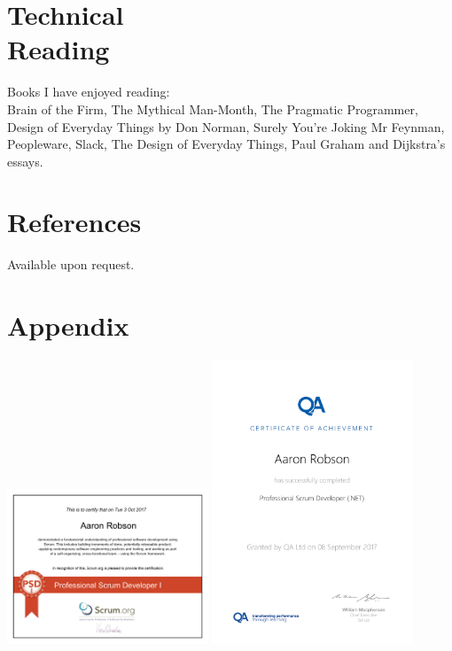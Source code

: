 \documentclass[line,margin]{res}
\begin{document}
\begin{resume}
\section{Technical \\ Reading}
Books I have enjoyed reading: \\
Brain of the Firm,
The Mythical Man-Month, %
The Pragmatic Programmer,
Design of Everyday Things by Don Norman,
Surely You're Joking Mr Feynman,
Peopleware, %
Slack,
The Design of Everyday Things,
Paul Graham and Dijkstra's essays.

\section{References}
Available upon request.

\section{Appendix}
\includegraphics[width=0.45\textwidth]{proof/PSDI.PDF}
\includegraphics[width=0.45\textwidth]{proof/50226508_1920.pdf}

\end{resume}
\end{document}

